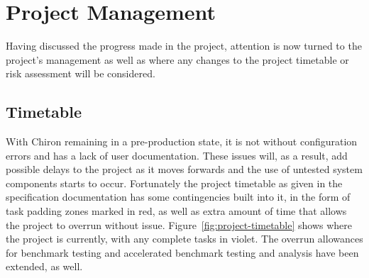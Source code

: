 \documentclass[12pt,a4paper]{article}
\begin{document}
    \section{Project Management}
    \label{sec:project_management}

        Having discussed the progress made in the project, attention is now turned to the project's management as well as where any changes to the project timetable or risk assessment will be considered.
    
        \subsection{Timetable}
        \label{sub:timetable}

            With Chiron remaining in a pre-production state, it is not without configuration errors and has a lack of user documentation. These issues will, as a result, add possible delays to the project as it moves forwards and the use of untested system components starts to occur. Fortunately the project timetable as given in the specification documentation has some contingencies built into it, in the form of task padding zones marked in red, as well as extra amount of time that allows the project to overrun without issue. Figure~\ref{fig:project-timetable} shows where the project is currently, with any complete tasks in violet. The overrun allowances for benchmark testing and accelerated benchmark testing and analysis have been extended, as well.
\end{document}
